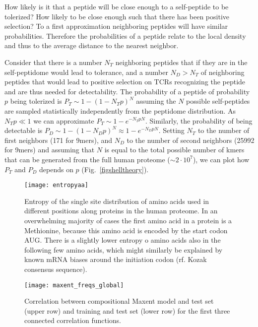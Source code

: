 \documentclass[superscriptaddress,twocolumn,pre]{revtex4}
\newcommand{\<}{\langle}
\renewcommand{\>}{\rangle}
\begin{document}
How likely is it that a peptide will be close enough to a self-peptide to be tolerized? How likely to be close enough such that there has been positive selection? To a first approximation neighboring peptides will have similar probabilities. Therefore the probabilities of a peptide relate to the local density and thus to the average distance to the nearest neighbor.

Consider that there is a number $N_T$ neighboring peptides that if they are in the self-peptidome would lead to tolerance, and a number $N_D > N_T$ of neighboring peptides that would lead to positive selection on TCRs recognizing the peptide and are thus needed for detectability. The probability of a peptide of probability $p$ being tolerized is $P_T \sim 1-(1-N_T p)^N$ assuming the $N$ possible self-peptides are sampled statistically independently from the peptidome distribution. As $N_T p \ll 1$ we can approximate $P_T \sim 1-e^{-N_T p N}$. Similarly, the probability of being detectable is $P_D \sim 1-(1-N_D p)^N \approx 1-e^{-N_D p N}$. Setting $N_T$ to the number of first neighbors (171 for 9mers), and $N_D$ to the number of second neighbors (25992 for 9mers) and assuming that $N$ is equal to the total possible number of kmers that can be generated from the full human proteome ($\sim 2 \cdot 10^7$), we can plot how $P_T$ and $P_D$ depends on $p$ (Fig.~\ref{figshelltheory}).



\begin{figure}
    \texttt{[image: entropyaa]}
    \caption{Entropy of the single site distribution of amino acids used in different positions along proteins in the human proteome. In an overwhelming majority of cases the first amino acid in a protein is a Methionine, because this amino acid is encoded by the start codon AUG. There is a slightly lower entropy o amino acids also in the following few amino acids, which might similarly be explained by known mRNA biases around the initiation codon (rf. Kozak consensus sequence). 
    \label{figentropyaa}
    }
\end{figure}




\begin{figure*}
    \texttt{[image: maxent\_freqs\_global]}
    \caption{Correlation between compositional Maxent model and test set (upper row) and training and test set (lower row) for the first three connected correlation functions.
    \label{figmaxent_freqs_global}
    }
\end{figure*}
\end{document}
